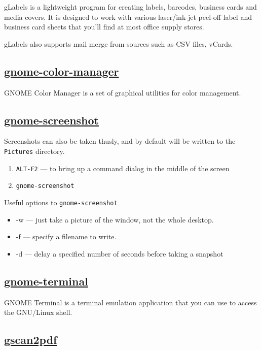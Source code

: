  gLabels is a lightweight program for creating labels, barcodes, business
 cards and media covers. It is designed to
 work with various laser/ink-jet peel-off label and business card sheets that
 you'll find at most office supply stores.
 
 gLabels also supports mail merge from sources such as CSV files, vCards.

\subsection{\href{https://git.gnome.org/browse/gnome-color-manager}{gnome-color-manager}}

 GNOME Color Manager is a set of graphical utilities for color
 management.

\subsection{\href{}{gnome-screenshot}}
Screenshots can also be taken thusly, and by default will be written to the
\texttt{Pictures} directory.

\begin{enumerate}
 \item\texttt{ALT-F2} --- to bring up a command dialog in the middle of the screen
 \item\texttt{gnome-screenshot}
\end{enumerate}

Useful options to \texttt{gnome-screenshot} 
\begin{itemize}
 \item{-w} --- just take a picture of the window, not the whole desktop.
 \item{-f} --- specify a filename to write.
 \item{-d} --- delay a specified number of seconds before taking a snapshot
\end{itemize}

\subsection{\href{}{gnome-terminal}}

 GNOME Terminal is a terminal emulation application that you can use to
 access the GNU/Linux shell.

\subsection{\href{http://gscan2pdf.sourceforge.net/}{gscan2pdf}}

